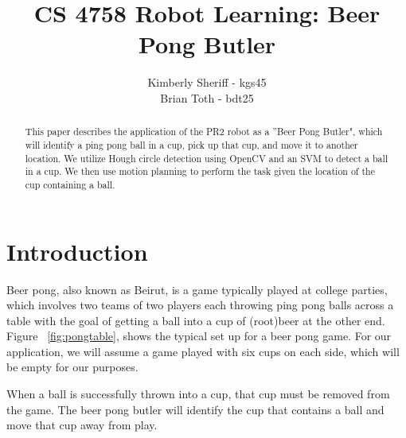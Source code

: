 \documentclass[letterpaper, 10 pt, conference]{ieeeconf}  %
\title{\LARGE \bf
CS 4758 Robot Learning: Beer Pong Butler
}
\author{Kimberly Sheriff - kgs45\\Brian Toth - bdt25}
\begin{document}
\maketitle
\thispagestyle{empty}
\pagestyle{empty}


\begin{abstract}

This paper describes the application of the PR2 robot as a ''Beer Pong Butler", which will identify a ping pong ball in a cup, pick up that cup, and move it to another location. We utilize Hough circle detection using OpenCV and an SVM to detect a ball in a cup. We then use motion planning to perform the task given the location of the cup containing a ball.

\end{abstract}


\section{Introduction}

Beer pong, also known as Beirut, is a game typically played at college parties, which involves two teams of two players each throwing ping pong balls across a table with the goal of getting a ball into a cup of (root)beer at the other end. Figure ~\ref{fig:pongtable}, shows the typical set up for a beer pong game. For our application, we will assume a game played with six cups on each side, which will be empty for our purposes. 

When a ball is successfully thrown into a cup, that cup must be removed from the game. The beer pong butler will identify the cup that contains a ball and move that cup away from play.
\end{document}
